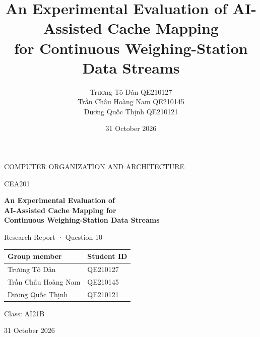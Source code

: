 \documentclass[11pt,a4paper]{article}
\title{An Experimental Evaluation of AI-Assisted Cache Mapping\\for Continuous Weighing-Station Data Streams}
\author{Trương Tô Dân \quad QE210127\\Trần Châu Hoàng Nam \quad QE210145\\Dương Quốc Thịnh \quad QE210121}
\date{31 October 2026}
\begin{document}
\hypersetup{pageanchor=false}
\begin{titlepage}
\centering
\vspace*{18mm}
{\large COMPUTER ORGANIZATION AND ARCHITECTURE\par}
\vspace{4mm}
{\large CEA201\par}
\vspace{20mm}
{\LARGE\bfseries An Experimental Evaluation of\\[3mm] AI-Assisted Cache Mapping for\\[3mm] Continuous Weighing-Station Data Streams\par}
\vspace{12mm}
{\large Research Report · Question 10\par}
\vspace{18mm}
\begin{tabular}{ll}
\toprule
\textbf{Group member} & \textbf{Student ID}\\
\midrule
Trương Tô Dân & QE210127\\
Trần Châu Hoàng Nam & QE210145\\
Dương Quốc Thịnh & QE210121\\
\bottomrule
\end{tabular}
\vspace{12mm}

{\large Class: AI21B\par}
\vfill
{\large 31 October 2026\par}
\end{titlepage}
\setcounter{page}{1}
\hypersetup{pageanchor=true}
\end{document}
